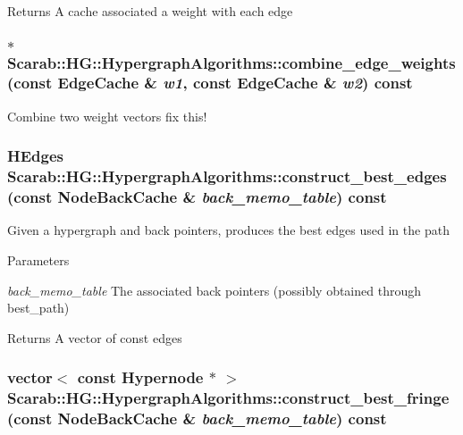 \begin{DoxyReturn}{Returns}
A cache associated a weight with each edge 
\end{DoxyReturn}
\hypertarget{classScarab_1_1HG_1_1HypergraphAlgorithms_ae815dc19968e9ab557d19dd2563fca38}{
\subsubsection[{combine\_\-edge\_\-weights}]{ $\ast$ Scarab::HG::HypergraphAlgorithms::combine\_\-edge\_\-weights (const {\bf EdgeCache} \& {\em w1}, \/  const {\bf EdgeCache} \& {\em w2}) const}}
\label{classScarab_1_1HG_1_1HypergraphAlgorithms_ae815dc19968e9ab557d19dd2563fca38}
Combine two weight vectors fix this! \hypertarget{classScarab_1_1HG_1_1HypergraphAlgorithms_ab054762a5d6a0af7ee667c8e90585668}{
\subsubsection[{construct\_\-best\_\-edges}]{\setlength{\rightskip}{0pt plus 5cm}HEdges Scarab::HG::HypergraphAlgorithms::construct\_\-best\_\-edges (const {\bf NodeBackCache} \& {\em back\_\-memo\_\-table}) const}}
\label{classScarab_1_1HG_1_1HypergraphAlgorithms_ab054762a5d6a0af7ee667c8e90585668}
Given a hypergraph and back pointers, produces the best edges used in the path 
\begin{DoxyParams}{Parameters}
\item[{\em back\_\-memo\_\-table}]The associated back pointers (possibly obtained through best\_\-path) \end{DoxyParams}
\begin{DoxyReturn}{Returns}
A vector of const edges 
\end{DoxyReturn}
\hypertarget{classScarab_1_1HG_1_1HypergraphAlgorithms_af5bcb325e1d58dd9d4c26517c4dfeca0}{
\subsubsection[{construct\_\-best\_\-fringe}]{\setlength{\rightskip}{0pt plus 5cm}vector$<$ const {\bf Hypernode} $\ast$ $>$ Scarab::HG::HypergraphAlgorithms::construct\_\-best\_\-fringe (const {\bf NodeBackCache} \& {\em back\_\-memo\_\-table}) const}}
